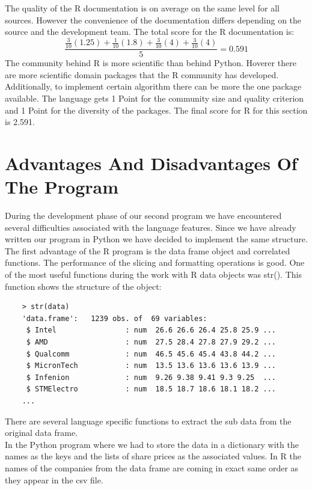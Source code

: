 \documentclass[
  twoside,
  11pt, a4paper,
  footinclude=true,
  headinclude=true,
  cleardoublepage=empty
]{scrreprt}
\begin{document}
    The quality of the R documentation is on average on the same level for all sources. However the convenience of the documentation differs depending on the source and the development team. The total score for the R documentation is:
    \[ \frac{\frac{3}{10}(1.25)+\frac{1}{10}(1.8)+\frac{3}{10}(4)+\frac{3}{10}(4)}{5}= 0.591 \] 
    The community behind R is more scientific than behind Python. Hoverer there are more scientific domain packages that the R community has developed. Additionally, to implement certain algorithm there can be more the one package available. The language gets 1 Point for the community size and quality criterion and 1 Point for the diversity of the packages. The final score for R for this section is 2.591.
    
    \section{Advantages And Disadvantages Of The Program}
    During the development phase of our second program we have encountered several difficulties associated with the language features. Since we have already written our program in Python we have decided to implement the same structure.\\
    The first advantage of the R program is the data frame object and correlated functions. The performance of the slicing and formatting operations is good. One of the most useful functions during the work with R data objects was str(). This function shows the structure of the object:
    \begin{verbatim}
    > str(data)
    'data.frame':   1239 obs. of  69 variables:
     $ Intel                : num  26.6 26.6 26.4 25.8 25.9 ...
     $ AMD                  : num  27.5 28.4 27.8 27.9 29.2 ...
     $ Qualcomm             : num  46.5 45.6 45.4 43.8 44.2 ...
     $ MicronTech           : num  13.5 13.6 13.6 13.6 13.9 ...
     $ Infenion             : num  9.26 9.38 9.41 9.3 9.25  ...
     $ STMElectro           : num  18.5 18.7 18.6 18.1 18.2 ...
    ...
    \end{verbatim}
    There are several language specific functions to extract the sub data from the original data frame.\\
    In the Python program where we had to store the data in a dictionary with the names as the keys and the lists of share prices as the associated values. In R the names of the companies from the data frame are coming in exact same order as they appear in the csv file.\\
\end{document}
